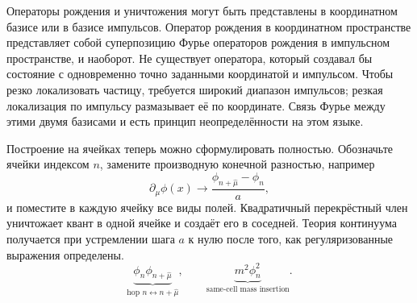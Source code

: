 Операторы рождения и уничтожения могут быть представлены в координатном базисе или в базисе импульсов. Оператор рождения в координатном пространстве представляет собой суперпозицию Фурье операторов рождения в импульсном пространстве, и наоборот. Не существует оператора, который создавал бы состояние с одновременно точно заданными координатой и импульсом. Чтобы резко локализовать частицу, требуется широкий диапазон импульсов; резкая локализация по импульсу размазывает её по координате. Связь Фурье между этими двумя базисами и есть принцип неопределённости на этом языке.

\begin{classroomqa}
\end{classroomqa}

Построение на ячейках теперь можно сформулировать полностью. Обозначьте ячейки индексом \(n\), замените производную конечной разностью, например
\begin{equation}
\partial_\mu\phi(x)
\longrightarrow
\frac{\phi_{n+\hat\mu}-\phi_n}{a},
\end{equation}
и поместите в каждую ячейку все виды полей. Квадратичный перекрёстный член уничтожает квант в одной ячейке и создаёт его в соседней. Теория континуума получается при устремлении шага \(a\) к нулю после того, как регуляризованные выражения определены.
\begin{equation}
\underbrace{\phi_n\phi_{n+\hat\mu}}_{\text{hop }n\leftrightarrow n+\hat\mu},
\qquad
\underbrace{m^2\phi_n^2}_{\text{same-cell mass insertion}}.
\end{equation}

\begin{classroomqa}
\end{classroomqa}

